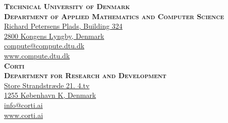 
\thispagestyle{empty} %

\vspace*{\fill}
\small%
\noindent
\textsc{\textbf{Technical University of Denmark}}\\
\textsc{\textbf{Department of Applied Mathematics and Computer Science}}
\smallskip\\
\href{https://goo.gl/maps/Dx6rNjGT9Ad5xKgZ6}{%
Richard Petersens Plads, Building 324\\
2800 Kongens Lyngby, Denmark}\\
\href{mailto:compute@compute.dtu.dk}{compute@compute.dtu.dk}\\
\href{www.compute.dtu.dk}{www.compute.dtu.dk}
\bigskip\\
\noindent
\textsc{\textbf{Corti}}\\
\textsc{\textbf{Department for Research and Development}}
\smallskip\\
\href{https://goo.gl/maps/X7en4p8vaHkfVuyJ7}{%
Store Strandstræde 21. 4.tv\\
1255 København K, Denmark}\\
\href{mailto:info@corti.ai}{info@corti.ai}\\
\href{www.corti.ai}{www.corti.ai}\\

\normalsize
\normalfont